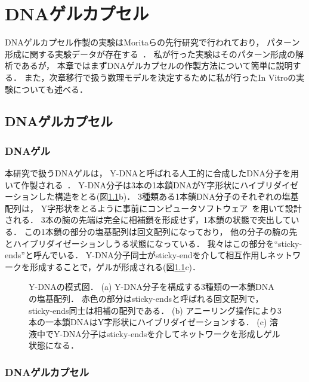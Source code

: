 \chapter{DNAゲルカプセル}
\label{sec:dnagel}

DNAゲルカプセル作製の実験はMoritaらの先行研究で行われており，
パターン形成に関する実験データが存在する~\cite{morita2017formation}．
私が行った実験はそのパターン形成の解析であるが，
本章ではまずDNAゲルカプセルの作製方法について簡単に説明する．
また，次章移行で扱う数理モデルを決定するために私が行ったIn Vitroの実験についても述べる．

\section{DNAゲルカプセル}

\subsection{DNAゲル}

本研究で扱うDNAゲルは，
Y-DNAと呼ばれる人工的に合成したDNA分子を用いて作製される~\cite{sato2019sequence}．
Y-DNA分子は3本の1本鎖DNAがY字形状にハイブリダイゼーションした構造をとる(図\ref{fig:ydna}b)．
3種類ある1本鎖DNA分子のそれぞれの塩基配列は，
Y字形状をとるように事前にコンピュータソフトウェア~\cite{zadeh2011nupack}を用いて設計される．
3本の腕の先端は完全に相補鎖を形成せず，1本鎖の状態で突出している．
この1本鎖の部分の塩基配列は回文配列になっており，
他の分子の腕の先とハイブリダイゼーションしうる状態になっている．
我々はこの部分を``sticky-ends''と呼んでいる．
Y-DNA分子同士がsticky-endを介して相互作用しネットワークを形成することで，ゲルが形成される(図\ref{fig:ydna}c)．

\begin{figure}
\centering

\caption{Y-DNAの模式図．
    (a) Y-DNA分子を構成する3種類の一本鎖DNAの塩基配列．
        赤色の部分はsticky-endsと呼ばれる回文配列で，sticky-ends同士は相補の配列である．
    (b) アニーリング操作により3本の一本鎖DNAはY字形状にハイブリダイゼーションする．
    (c) 溶液中でY-DNA分子はsticky-endsを介してネットワークを形成しゲル状態になる．
}

\label{fig:ydna}
\end{figure}

\subsection{DNAゲルカプセル}

